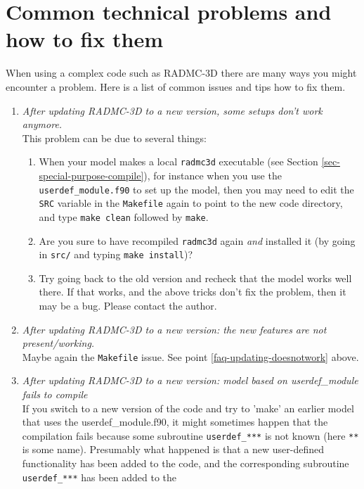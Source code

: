\documentclass{report}
\begin{document}
\section{Common technical problems and how to fix them}
When using a complex code such as RADMC-3D there are many ways you might
encounter a problem. Here is a list of common issues and tips how to fix them.
\begin{enumerate}
\item {\em After updating RADMC-3D to a new version, some setups don't work anymore.}\\
  \label{faq-updating-doesnotwork}
  This problem can be due to several things:
  \begin{enumerate}
  \item When your model makes a local {\small\tt radmc3d} executable (see
    Section \ref{sec-special-purpose-compile}), for instance when you use
    the {\small\tt userdef\_module.f90} to set up the model, then you may
    need to edit the {\small\tt SRC} variable in the {\small\tt Makefile}
    again to point to the new code directory, and type {\small\tt make
      clean} followed by {\small\tt make}.
  \item Are you sure to have recompiled {\small\tt radmc3d} again {\em and}
    installed it (by going in {\small\tt src/} and typing {\small\tt make
      install})?
  \item Try going back to the old version and recheck that the model works
    well there. If that works, and the above tricks don't fix the problem,
    then it may be a bug. Please contact the author.
  \end{enumerate}
\item {\em After updating RADMC-3D to a new version: the new features are not present/working.}\\
  Maybe again the {\small\tt Makefile} issue. See point \ref{faq-updating-doesnotwork}
  above.
\item {\em After updating RADMC-3D to a new version: model based on userdef\_module fails to compile}\\
  If you switch to a new version of the code and try to 'make' an earlier
  model that uses the userdef\_module.f90, it might sometimes happen that
  the compilation fails because some subroutine {\small\tt userdef\_***} is
  not known (here {\small\tt ***} is some name). Presumably what happened is
  that a new user-defined functionality has been added to the code, and the
  corresponding subroutine {\small\tt userdef\_***} has been added to the

\end{enumerate}
\end{document}
